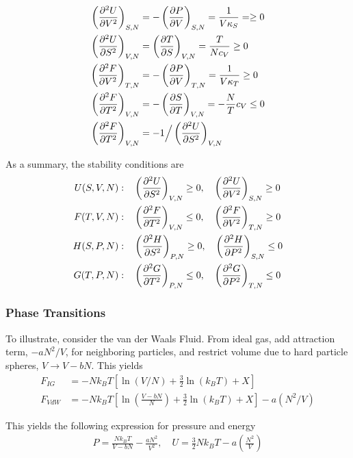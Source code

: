 \documentclass[a4paper, english, 12pt]{article}
\newcommand{\closed}[1]{\left( #1 \right)}
\newcommand{\bracket}[1]{\left[ #1 \right]}
\begin{document}
\begin{multicols*}{2}
\begin{align*}
    \closed{\pdv[2]{U}{V}}_{S,N} &= -\closed{\pdv{P}{V}}_{S,N} = \frac{1}{V\kappa_S} =  \geq0 \\
    \closed{\pdv[2]{U}{S}}_{V,N} &= \closed{\pdv{T}{S}}_{V,N} = \frac{T}{N c_V} \geq 0 \\
    \closed{\pdv[2]{F}{V}}_{T,N} &= -\closed{\pdv{P}{V}}_{T,N} = \frac{1}{V \kappa_T} \geq 0 \\ 
    \closed{\pdv[2]{F}{T}}_{V,N} &= -\closed{\pdv{S}{T}}_{V,N} = -\frac{N}{T}c_V \leq 0 \\
    \closed{\pdv[2]{F}{T}}_{V,N} &= - 1 \Big/ \closed{\pdv[2]{U}{S}}_{V,N} 
\end{align*} 

As a summary, the stability conditions are 
\begin{align*}
    U(S,V,N):&\quad \closed{\pdv[2]{U}{S}}_{V,N} \geq0,\quad \closed{\pdv[2]{U}{V}}_{S,N} \geq 0 \\ 
    F(T,V,N):&\quad \closed{\pdv[2]{F}{T}}_{V,N} \leq0,\quad \closed{\pdv[2]{F}{V}}_{T,N} \geq 0 \\
    H(S,P,N):&\quad \closed{\pdv[2]{H}{S}}_{P,N} \geq0,\quad \closed{\pdv[2]{H}{P}}_{S,N} \leq 0 \\ 
    G(T,P,N):&\quad \closed{\pdv[2]{G}{T}}_{P,N} \leq0,\quad \closed{\pdv[2]{G}{P}}_{T,N} \leq 0 
\end{align*}



\subsubsection*{\scriptsize Phase Transitions}
To illustrate, consider the van der Waals Fluid. From ideal gas, add attraction term, $-a N^2/V$, for neighboring particles, and restrict volume due to hard particle spheres, $V\to V-bN$. This yields 
\begin{align*}
    F_{IG} &= -N k_B T \bracket{\ln(V/N) + \frac{3}{2}\ln(k_B T)+X} \\ 
    F_{VdW} &= - N k_B T \bracket{\ln\closed{\frac{V-bN}{N}} + \frac{3}{2}\ln(k_B T)+X} - a(N^2/V)
\end{align*}

This yields the following expression for pressure and energy 
\begin{align*}
    P = \frac{Nk_B T}{V - bN} - \frac{a N^2}{V^2},\quad U = \frac{3}{2}N k_B T - a \closed{\frac{N^2}{V}}
\end{align*}



\end{multicols*}
\end{document}
